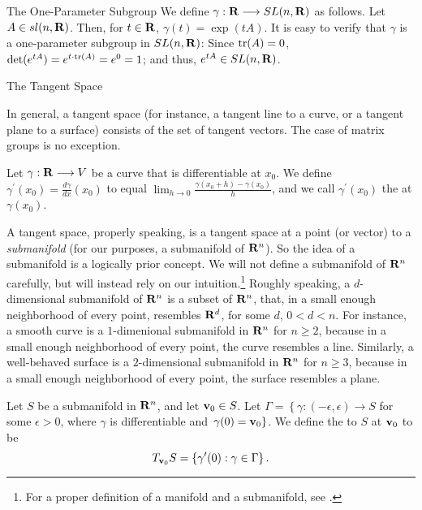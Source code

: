 \begin{section}{The One-Parameter Subgroup}
We define $\gamma: \mathbf{R} \longrightarrow SL(n, \mathbf{R})$ as follows.  Let $A \in sl(n, \mathbf{R})$.  Then, for $t \in \mathbf{R}$, $\gamma(t) = \exp(tA)$.  It is easy to verify that $\gamma$ is a one-parameter subgroup in $SL(n, \mathbf{R})$:  Since $\mathrm{tr}(A) = 0$, $\det(e^{tA}) = e^{t \cdot \mathrm{tr}(A)} = e^0 = 1$; and thus, $e^{tA} \in SL(n, \mathbf{R})$.

\end{section}

\begin{section}{The Tangent Space}

In general, a tangent space (for instance, a tangent line to a curve, or a tangent plane to a surface) consists of the set of tangent vectors.  The case of matrix groups is no exception.

\begin{definition}
\label{tanvec}
Let $\gamma: \mathbf{R} \longrightarrow V$ be a curve that is differentiable at $x_0$.  We define $\gamma^\prime \left( x_0 \right) = \frac{d \gamma}{dx}\left( x_0 \right)$ to equal $\lim_{h \to 0}\frac{\gamma \left( x_0 + h \right) - \gamma \left( x_0 \right) }{h}$, and we call $\gamma^\prime \left( x_0 \right)$ the  at $\gamma \left( x_0 \right)$.
\end{definition}

A tangent space, properly speaking, is a tangent space at a point (or vector) to a \emph{submanifold} (for our purposes, a submanifold of $\mathbf{R}^n$).  So the idea of a submanifold is a logically prior concept.  We will not define a submanifold of $\mathbf{R}^n$ carefully, but will instead rely on our intuition.\footnote{For a proper definition of a manifold and a submanifold, see \cite{munkres}.}  Roughly speaking, a $d$-dimensional submanifold of $\mathbf{R}^n$ is a subset of $\mathbf{R}^n$, that, in a small enough neighborhood of every point, resembles $\mathbf{R}^d$, for some $d$, $0 < d < n$.  For instance, a smooth curve is a $1$-dimenional submanifold in $\mathbf{R}^n$ for $n \ge 2$, because in a small enough neighborhood of every point, the curve resembles a line.  Similarly, a well-behaved surface is a $2$-dimensional submanifold in $\mathbf{R}^n$ for $n \ge 3$, because in a small enough neighborhood of every point, the surface resembles a plane.

\begin{definition}
\label{tanspace}
Let $S$ be a submanifold in $\mathbf{R}^n$, and let $\mathbf{v}_0 \in S$.  Let $\Gamma = \left\{ \gamma : (-\epsilon, \epsilon) \longrightarrow S \right.$ for some $\epsilon > 0$, where $\gamma$ is differentiable and $\left. \gamma(0) = \mathbf{v}_0 \right\}$.  We define the  to $S$ at $\mathbf{v}_0$ to be
\[
T_{\mathbf{v}_0}S = \left\{ \gamma^\prime(0) : \gamma \in \Gamma \right\}.
\]
\end{definition}


\end{section}
